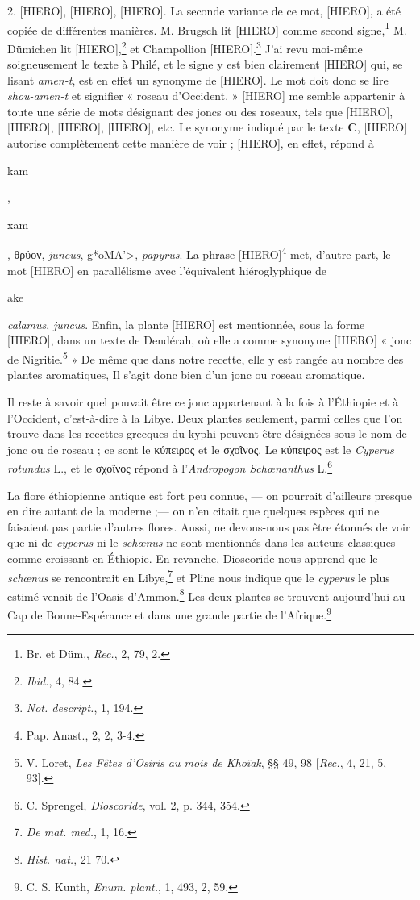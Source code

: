 \documentclass[a4paper, 11pt, oneside]{article}
\begin{document}
2. [HIERO], [HIERO], [HIERO]. La seconde variante de ce mot, [HIERO], a été copiée de différentes manières. M. Brugsch lit [HIERO] comme second signe,\footnote{Br. et Düm., \emph{Rec.}, 2, 79, 2.} M. Dümichen lit [HIERO],\footnote{\emph{Ibid.}, 4, 84.} et Champollion [HIERO].\footnote{\emph{Not. descript.}, 1, 194.} J'ai revu moi-même soigneusement le texte à Philé, et le signe y est bien clairement [HIERO] qui, se lisant \emph{amen-t}, est en effet un synonyme de [HIERO]. Le mot doit donc se lire \emph{shou-amen-t} et signifier « roseau d'Occident. » [HIERO] me semble appartenir à toute une série de mots désignant des joncs ou des roseaux, tels que [HIERO], [HIERO], [HIERO], [HIERO], etc. Le synonyme indiqué par le texte \textbf{C}, [HIERO] autorise complètement cette manière de voir ; [HIERO], en effet, répond à \begin{coptic}kam\end{coptic}, \begin{coptic}xam\end{coptic}, θρύον, \emph{juncus}, \foreignlanguage{hebrew}{\<g*oMA'>}, \emph{papyrus}. La phrase [HIERO]\footnote{Pap. Anast., 2, 2, 3-4.} met, d'autre part, le mot [HIERO] en parallélisme avec l'équivalent hiéroglyphique de \begin{coptic}ake\end{coptic} \emph{calamus}, \emph{juncus}. Enfin, la plante [HIERO] est mentionnée, sous la forme [HIERO], dans un texte de Dendérah, où elle a comme synonyme [HIERO] « jonc de Nigritie.\footnote{V. Loret, \emph{Les Fêtes d'Osiris au mois de Khoïak}, §§ 49, 98 [\emph{Rec.}, 4, 21, 5, 93].} » De même que dans notre recette, elle y est rangée au nombre des plantes aromatiques, Il s'agit donc bien d'un jonc ou roseau aromatique.

Il reste à savoir quel pouvait être ce jonc appartenant à la fois à l'Éthiopie et à l'Occident, c'est-à-dire à la Libye. Deux plantes seulement, parmi celles que l'on trouve dans les recettes grecques du kyphi peuvent être désignées sous le nom de jonc ou de roseau ; ce sont le κύπειρος et le σχοῖνος. Le κύπειρος est le \emph{Cyperus rotundus} L., et le σχοῖνος répond à l'\emph{Andropogon Schœnanthus} L.\footnote{C. Sprengel, \emph{Dioscoride}, vol. 2, p. 344, 354.}

La flore éthiopienne antique est fort peu connue, --- on pourrait d'ailleurs presque en dire autant de la moderne ;--- on n'en citait que quelques espèces qui ne faisaient pas partie d'autres flores. Aussi, ne devons-nous pas être étonnés de voir que ni de \emph{cyperus} ni le \emph{schœnus} ne sont mentionnés dans les auteurs classiques comme croissant en Éthiopie. En revanche, Dioscoride nous apprend que le \emph{schœnus} se rencontrait en Libye,\footnote{\emph{De mat. med.}, 1, 16.} et Pline nous indique que le \emph{cyperus} le plus estimé venait de l'Oasis d'Ammon.\footnote{\emph{Hist. nat.}, 21 70.} Les deux plantes se trouvent aujourd'hui au Cap de Bonne-Espérance et dans une grande partie de l'Afrique.\footnote{C. S. Kunth, \emph{Enum. plant.}, 1, 493, 2, 59.}
\end{document}
